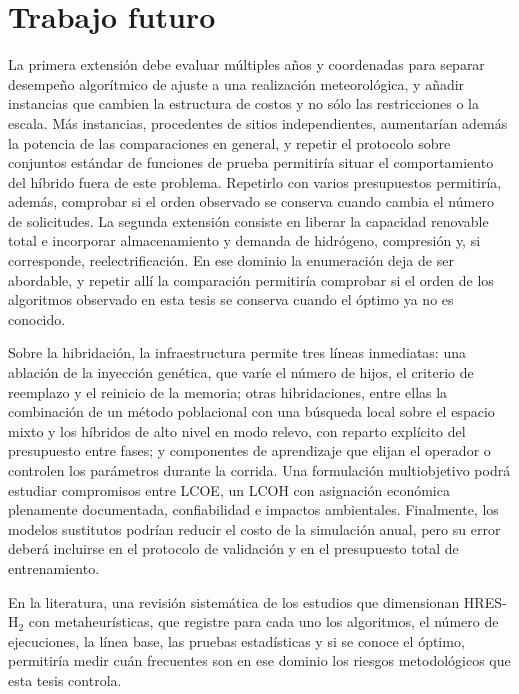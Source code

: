 \section{Trabajo futuro}

La primera extensión debe evaluar múltiples años y coordenadas para separar desempeño algorítmico de ajuste a una realización meteorológica, y añadir instancias que cambien la estructura de costos y no sólo las restricciones o la escala. Más instancias, procedentes de sitios independientes, aumentarían además la potencia de las comparaciones en general, y repetir el protocolo sobre conjuntos estándar de funciones de prueba permitiría situar el comportamiento del híbrido fuera de este problema. Repetirlo con varios presupuestos permitiría, además, comprobar si el orden observado se conserva cuando cambia el número de solicitudes. La segunda extensión consiste en liberar la capacidad renovable total e incorporar almacenamiento y demanda de hidrógeno, compresión y, si corresponde, reelectrificación. En ese dominio la enumeración deja de ser abordable, y repetir allí la comparación permitiría comprobar si el orden de los algoritmos observado en esta tesis se conserva cuando el óptimo ya no es conocido.

Sobre la hibridación, la infraestructura permite tres líneas inmediatas: una ablación de la inyección genética, que varíe el número de hijos, el criterio de reemplazo y el reinicio de la memoria; otras hibridaciones, entre ellas la combinación de un método poblacional con una búsqueda local sobre el espacio mixto y los híbridos de alto nivel en modo relevo, con reparto explícito del presupuesto entre fases; y componentes de aprendizaje que elijan el operador o controlen los parámetros durante la corrida. Una formulación multiobjetivo podrá estudiar compromisos entre LCOE, un LCOH con asignación económica plenamente documentada, confiabilidad e impactos ambientales. Finalmente, los modelos sustitutos podrían reducir el costo de la simulación anual, pero su error deberá incluirse en el protocolo de validación y en el presupuesto total de entrenamiento.

En la literatura, una revisión sistemática de los estudios que dimensionan HRES-H$_2$ con metaheurísticas, que registre para cada uno los algoritmos, el número de ejecuciones, la línea base, las pruebas estadísticas y si se conoce el óptimo, permitiría medir cuán frecuentes son en ese dominio los riesgos metodológicos que esta tesis controla.
